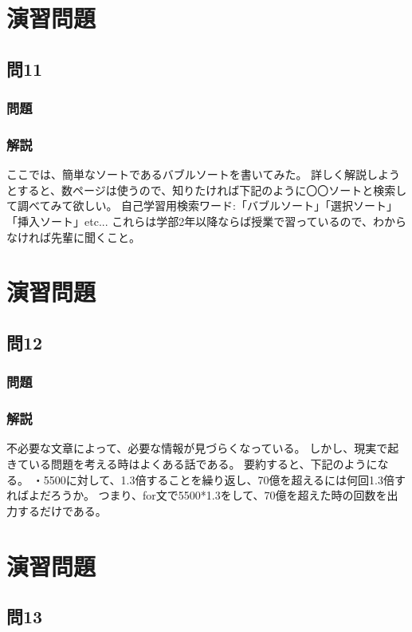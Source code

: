 \section{演習問題}
\subsection{問11}
\subsubsection{問題}

\subsubsection{解説}

ここでは、簡単なソートであるバブルソートを書いてみた。
詳しく解説しようとすると、数ページは使うので、知りたければ下記のように〇〇ソートと検索して調べてみて欲しい。
自己学習用検索ワード:「バブルソート」「選択ソート」「挿入ソート」etc...
これらは学部2年以降ならば授業で習っているので、わからなければ先輩に聞くこと。

\section{演習問題}
\subsection{問12}
\subsubsection{問題}

\subsubsection{解説}

不必要な文章によって、必要な情報が見づらくなっている。
しかし、現実で起きている問題を考える時はよくある話である。
要約すると、下記のようになる。
・5500に対して、1.3倍することを繰り返し、70億を超えるには何回1.3倍すればよだろうか。
つまり、for文で5500*1.3をして、70億を超えた時の回数を出力するだけである。

\section{演習問題}
\subsection{問13}

